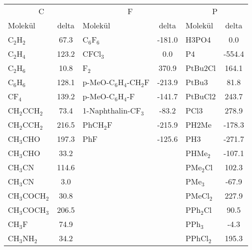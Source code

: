 \begin{table}[ht!]
  	\centering
	\captionsetup{tablewithin = chapter}
	\captionsetup{font=small, labelfont=bf}
    \begin{tabular}{lc|lc|lc}
    \hline
    \hline
    \multicolumn{2}{c}{C} & \multicolumn{2}{c}{F} & \multicolumn{2}{c}{P} \\
    Molekül & delta & Molekül & delta & Molekül & delta \\
    \hline
    C$_{2}$H$_{2}$  & 67.3  & C$_{6}$F$_{6}$  & -181.0 & H3PO4 & 0.0 \\
    C$_{2}$H$_{4}$  & 123.2 & CFCl$_{3}$ & 0.0   & P4    & -554.4 \\
    C$_{2}$H$_{6}$  & 10.8  & F$_{2}$    & 370.9 & PtBu2Cl & 164.1 \\
    C$_{6}$H$_{6}$  & 128.1 & p-MeO-C$_{6}$H$_{4}$-CH$_{2}$F & -213.9 & PtBu3 & 81.8 \\
    CF$_{4}$   & 139.2 & p-MeO-C$_{6}$H$_{4}$-F & -141.7 & PtBuCl2 & 243.7 \\
    CH$_{2}$CCH$_{2}$ & 73.4  & 1-Naphthalin-CF$_{3}$ & -83.2 & PCl3  & 278.9 \\
    CH$_{2}$CCH$_{2}$ & 216.5 & PhCH$_{2}$F & -215.9 & PH2Me & -178.3 \\
    CH$_{3}$CHO & 197.3 & PhF   & -125.6 & PH3   & -271.7 \\
    CH$_{3}$CHO & 33.2 &       &  & PHMe$_{2}$ & -107.1  \\
    CH$_{3}$CN & 114.6 &       &  & PMe$_{2}$Cl & 102.3   \\
    CH$_{3}$CN & 3.0   &       &  & PMe$_{3}$  & -67.9   \\
    CH$_{3}$COCH$_{2}$ & 30.8  &       &  & PMeCl$_{2}$ & 227.9   \\
    CH$_{3}$COCH$_{3}$ & 206.5 &       &  & PPh$_{2}$Cl & 90.5    \\
    CH$_{3}$F  & 74.9  &       &  & PPh$_{3}$  & -4.3    \\
    CH$_{3}$NH$_{2}$ & 34.2  &       &  & PPhCl$_{2}$ & 195.3   \\

\end{tabular}
\end{table}
